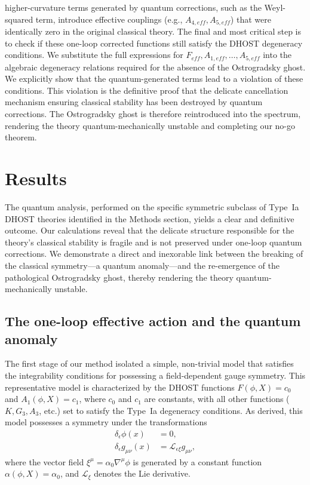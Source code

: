 \documentclass[twocolumn]{aastex631}
\begin{document}
higher-curvature terms generated by quantum corrections, such as the Weyl-squared term, introduce effective couplings (e.g., $A_{4,eff}, A_{5,eff}$) that were identically zero in the original classical theory. \citep{velascoaja2022quantumcorrectionseinsteinsequations,ma2024surprisingeffectivenessweylgravity,fröb2025weylanomalyinteractingquantum}The final and most critical step is to check if these one-loop corrected functions still satisfy the DHOST degeneracy conditions. We substitute the full expressions for $F_{eff}, A_{1,eff}, \dots, A_{5,eff}$ into the algebraic degeneracy relations required for the absence of the Ostrogradsky ghost. We explicitly show that the quantum-generated terms lead to a violation of these conditions. This violation is the definitive proof that the delicate cancellation mechanism ensuring classical stability has been destroyed by quantum corrections. The Ostrogradsky ghost is therefore reintroduced into the spectrum, rendering the theory quantum-mechanically unstable and completing our no-go theorem.

\section{Results}
\label{sec:results}
The quantum analysis, performed on the specific symmetric subclass of Type~Ia DHOST theories identified in the Methods section, yields a clear and definitive outcome. Our calculations reveal that the delicate structure responsible for the theory's classical stability is fragile and is not preserved under one-loop quantum corrections. We demonstrate a direct and inexorable link between the breaking of the classical symmetry---a quantum anomaly---and the re-emergence of the pathological Ostrogradsky ghost, thereby rendering the theory quantum-mechanically unstable.

\subsection{The one-loop effective action and the quantum anomaly}
The first stage of our method isolated a simple, non-trivial model that satisfies the integrability conditions for possessing a field-dependent gauge symmetry. This representative model is characterized by the DHOST functions $F(\phi, X) = c_0$ and $A_1(\phi, X) = c_1$, where $c_0$ and $c_1$ are constants, with all other functions ($K, G_3, A_3$, etc.) set to satisfy the Type~Ia degeneracy conditions. As derived, this model possesses a symmetry under the transformations
\begin{align}
    \delta_\epsilon \phi(x) &= 0, \label{eq:symm_phi} \\
    \delta_\epsilon g_{\mu\nu}(x) &= \mathcal{L}_{\epsilon \xi} g_{\mu\nu}, \label{eq:symm_g}
\end{align}
where the vector field $\xi^\mu = \alpha_0 \nabla^\mu\phi$ is generated by a constant function $\alpha(\phi, X) = \alpha_0$, and $\mathcal{L}_{\xi}$ denotes the Lie derivative.
\end{document}
